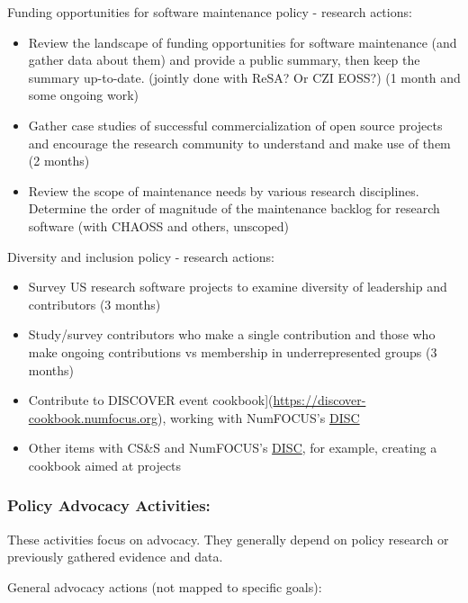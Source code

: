 \documentclass[
]{book}
\begin{document}
Funding opportunities for software maintenance policy - research actions:

\begin{itemize}
\item
  Review the landscape of funding opportunities for software maintenance (and gather data about them)
  and provide a public summary, then keep the summary up-to-date. (jointly done with ReSA? Or CZI EOSS?)
  (1 month and some ongoing work)
\item
  Gather case studies of successful commercialization of open source projects and encourage the
  research community to understand and make use of them (2 months)
\item
  Review the scope of maintenance needs by various research disciplines. Determine the order of
  magnitude of the maintenance backlog for research software (with CHAOSS and others, unscoped)
\end{itemize}

Diversity and inclusion policy - research actions:

\begin{itemize}
\item
  Survey US research software projects to examine diversity of leadership and contributors (3 months)
\item
  Study/survey contributors who make a single contribution and those who make ongoing contributions
  vs membership in underrepresented groups (3 months)
\item
  Contribute to DISCOVER event cookbook{]}(\url{https://discover-cookbook.numfocus.org}), working with
  NumFOCUS's \href{https://numfocus.org/programs/diversity-inclusion}{DISC}
\item
  Other items with CS\&S and NumFOCUS's \href{https://numfocus.org/programs/diversity-inclusion}{DISC},
  for example, creating a cookbook aimed at projects
\end{itemize}

\hypertarget{policy-advocacy-activities}{%
\subsubsection{Policy Advocacy Activities:}\label{policy-advocacy-activities}}

These activities focus on advocacy. They generally depend on policy research or previously
gathered evidence and data.

General advocacy actions (not mapped to specific goals):
\end{document}
